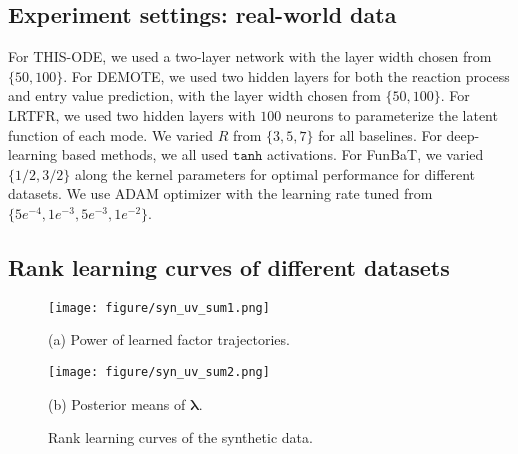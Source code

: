 \subsection{Experiment settings: real-world data}
\label{ap:setting2}
For THIS-ODE, we used a two-layer network with the layer width  chosen from $\{50, 100\}$. For DEMOTE, we used two hidden layers for both the reaction process and entry value prediction, with the layer width chosen from $\{50, 100\}$. For LRTFR, we  used two hidden layers with $100$ neurons to  parameterize the latent function of each mode.
We varied $R$  from $\{3,5,7\}$ for all baselines.
 For deep-learning based methods, we all used  $\texttt{tanh}$ activations. For FunBaT, we varied  $\{1/2, 3/2\}$ along the kernel parameters for optimal performance for different datasets.
We use ADAM optimizer with the learning rate tuned from  $\{5e^{-4}, 1e^{-3}, 5e^{-3}, 1e^{-2}\}$. 


\subsection{Rank learning curves of different datasets}
\label{ap:learning_curve}
\begin{figure*}[h]
    \centering
    \begin{minipage}{0.41\textwidth}
        \centering
        \texttt{[image: figure/syn\_uv\_sum1.png]}
        \caption*{(a) Power of learned factor trajectories.}
    \end{minipage}
    \begin{minipage}{0.41\textwidth}
        \centering
        \texttt{[image: figure/syn\_uv\_sum2.png]}
        \caption*{(b) Posterior means of $\boldsymbol{\lambda}$.}
    \end{minipage}
    \caption{Rank learning curves of the synthetic data.}
    \label{fig:learning_curve_syn}
\end{figure*}


